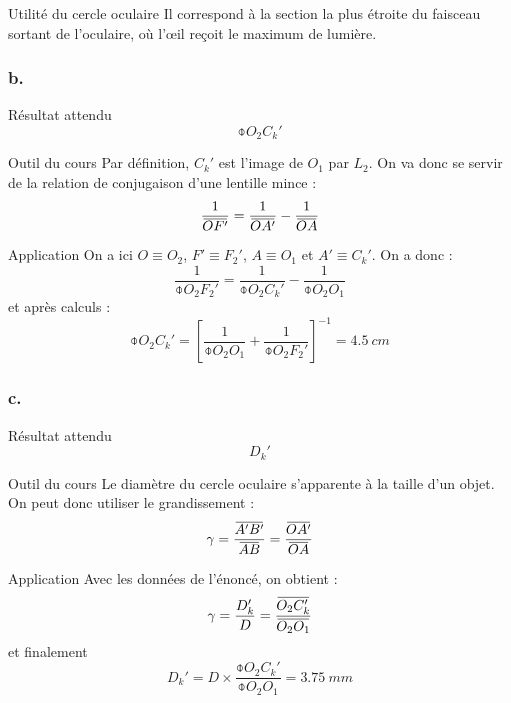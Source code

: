 \documentclass[10pt,a5paper,notitlepage]{book}
\begin{document}
\begin{inte}{Utilité du cercle oculaire}
    Il correspond à la section la plus étroite du faisceau sortant de
    l'oculaire, où l'œil reçoit le maximum de lumière.  
\end{inte}

\setcounter{subsubsection}{2}
\subsubsection{b.}
\begin{rtcb}{Résultat attendu}
    $$\obar{O_2C_k'}$$
\end{rtcb}

\begin{btcb}{Outil du cours}
    Par définition, $C_k'$ est l'image de $O_1$ par $L_2$. On va donc se servir
    de la relation de conjugaison d'une lentille mince :
    \[ \frac{1}{\OF} = \frac{1}{\OAp} - \frac{1}{\OA} \]
\end{btcb}

\begin{lgtcb}{Application}
    On a ici $O \equiv O_2$, $F' \equiv F_2'$, $A \equiv O_1$ et $A' \equiv
    C_k'$. On a donc :
    \[ \frac{1}{\obar{O_2F_2'}} = \frac{1}{\obar{O_2C_k'}} -
    \frac{1}{\obar{O_2O_1}} \]
    et après calculs :
    \[ \boxed{\obar{O_2C_k'} = \left[ \frac{1}{\obar{O_2O_1}} +
    \frac{1}{\obar{O_2F_2'}}\right]^{-1} = \SI{+4.5}{cm}} \]
\end{lgtcb}

\setcounter{subsubsection}{2}
\subsubsection{c.}
\begin{rtcb}{Résultat attendu}
    $$D_k'$$
\end{rtcb}

\begin{btcb}{Outil du cours}
    Le diamètre du cercle oculaire s'apparente à la taille d'un objet. On peut
    donc utiliser le grandissement :
    \[ \g = \frac{\ABp}{\ABb} = \frac{\OAp}{\OA} \]
\end{btcb}

\begin{lgtcb}{Application}
    Avec les données de l'énoncé, on obtient :
    \[ \g = \frac{D_k'}{D} = \frac{\obar{O_2C_k'}}{\obar{O_2O_1}}\]
    et finalement
    \[ \boxed{D_k' = D\times \frac{\obar{O_2C_k'}}{\obar{O_2O_1}} =
    \SI{3.75}{mm}} \]
\end{lgtcb}
\end{document}
